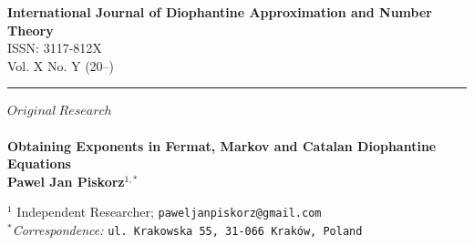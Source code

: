 \documentclass[11pt]{article}
\begin{document}
\noindent
\begin{minipage}[t]{0.85\textwidth}
\textbf{International Journal of Diophantine Approximation and Number Theory}\\
ISSN: 3117-812X\\
Vol. X No. Y (20--)
\end{minipage}
\vspace{0.7cm}
\hrule
\vspace{0.7cm}


{\Large{$Original\ Research$}}\\
\\
{\LARGE\bfseries Obtaining Exponents in Fermat, Markov and Catalan Diophantine Equations}\\[0.5cm]









\noindent
\textbf{Pawel Jan Piskorz}$^{1,*}$

\vspace{0.2cm}

\noindent
\begin{minipage}[t]{0.32\textwidth}

\end{minipage}
\hfill
\begin{minipage}[t]{0.65\textwidth} 

\noindent
$^{1}$ Independent Researcher; \texttt{paweljanpiskorz@gmail.com}\\
\noindent
$^{*}$\textit{Correspondence:} \texttt{ul.~Krakowska 55, 31-066 Kraków, Poland}

\vspace{1cm}



\end{minipage}
\end{document}
